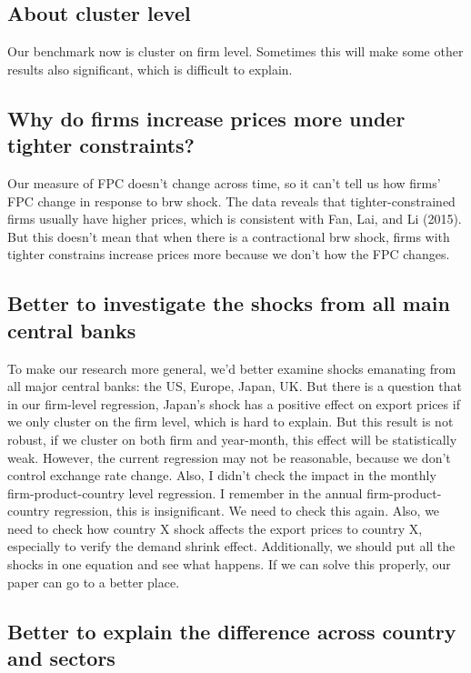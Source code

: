 \documentclass[12pt]{article}
\begin{document}
\subsection{About cluster level}
Our benchmark now is cluster on firm level. Sometimes this will make some other results also significant, which is difficult to explain. 

\subsection{Why do firms increase prices more under tighter constraints?}

Our measure of FPC doesn’t change across time, so it can’t tell us how firms’ FPC change in response to brw shock. The data reveals that tighter-constrained firms usually have higher prices, which is consistent with Fan, Lai, and Li (2015). But this doesn’t mean that when there is a contractional brw shock, firms with tighter constrains increase prices more because we don’t how the FPC changes.

\subsection{Better to investigate the shocks from all main central banks}

To make our research more general, we'd better examine shocks emanating from all major central banks: the US, Europe, Japan, UK. But there is a question that in our firm-level regression, Japan's shock has a positive effect on export prices if we only cluster on the firm level, which is hard to explain. But this result is not robust, if we cluster on both firm and year-month, this effect will be statistically weak. However, the current regression may not be reasonable, because we don't control exchange rate change. Also, I didn't check the impact in the monthly firm-product-country level regression. I remember in the annual firm-product-country regression, this is insignificant. We need to check this again. Also, we need to check how country X shock affects the export prices to country X, especially to verify the demand shrink effect. Additionally, we should put all the shocks in one equation and see what happens. If we can solve this properly, our paper can go to a better place.

\subsection{Better to explain the difference across country and sectors}
\end{document}
